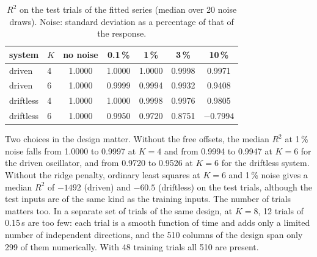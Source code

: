 \documentclass[11pt,a4paper]{article}
\theoremstyle{remark}
\begin{document}
\begin{table}[t]\centering\small
\caption{$R^2$ on the test trials of the fitted series (median over 20 noise draws). Noise: standard deviation as a percentage of that of the response.}\label{tab:fitr2}
\begin{tabular}{llccccc}\toprule
system & $K$ & no noise & 0.1\,\% & 1\,\% & 3\,\% & 10\,\%\\\midrule
driven & 4 & 1.0000 & 1.0000 & 1.0000 & 0.9998 & 0.9971\\
driven & 6 & 1.0000 & 0.9999 & 0.9994 & 0.9932 & 0.9408\\
driftless & 4 & 1.0000 & 1.0000 & 0.9998 & 0.9976 & 0.9805\\
driftless & 6 & 1.0000 & 0.9950 & 0.9720 & 0.8751 & $-0.7994$\\
\bottomrule\end{tabular}
\end{table}

Two choices in the design matter.
Without the free offsets, the median $R^2$ at 1\,\% noise falls from 1.0000 to 0.9997 at $K=4$ and from 0.9994 to 0.9947 at $K=6$ for the driven oscillator, and from 0.9720 to 0.9526 at $K=6$ for the driftless system.
Without the ridge penalty, ordinary least squares at $K=6$ and 1\,\% noise gives a median $R^2$ of $-1492$ (driven) and $-60.5$ (driftless) on the test trials, although the test inputs are of the same kind as the training inputs.
The number of trials matters too.
In a separate set of trials of the same design, at $K=8$, 12 trials of 0.15\,s are too few: each trial is a smooth function of time and adds only a limited number of independent directions, and the 510 columns of the design span only 299 of them numerically. With 48 training trials all 510 are present.
\end{document}
